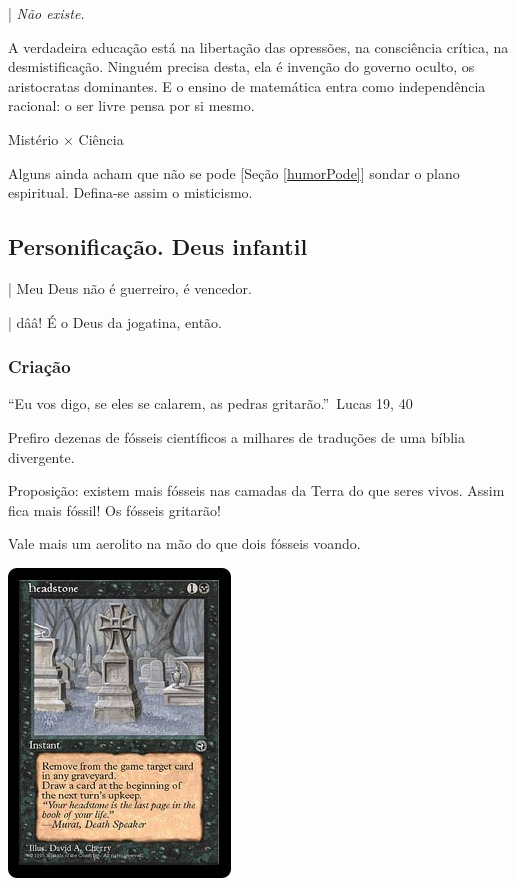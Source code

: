 \documentclass[12pt,a4paper]{article}
\begin{document}
			| \emph{N\~ao existe.}\cite{quevedo}

			A verdadeira educa\c{c}\~ao est\'a na liberta\c{c}\~ao das opressões, na consci\^encia cr\'itica, na desmistifica\c{c}\~ao\cite{freire}. Ningu\'em precisa desta, ela \'e inven\c{c}\~ao do governo oculto, os aristocratas dominantes. E o ensino de matem\'atica entra como independ\^encia racional: o ser livre pensa por si mesmo.

			Mist\'erio $ \times $ Ci\^encia

			Alguns ainda acham que n\~ao se pode [Se\c{c}\~ao \ref{humorPode}] sondar o plano espiritual. Defina-se assim o misticismo.

		\subsection{Personifica\c{c}\~ao. Deus infantil}\label{infantil}
			\begin{flushright}
			\end{flushright}

| Meu Deus n\~ao \'e guerreiro, \'e vencedor.

| d\^a\^a! \'E o Deus da jogatina, ent\~ao.

			\subsubsection{Cria\c{c}\~ao}
				\begin{flushright}
				\end{flushright}

			\textquotedblleft Eu vos digo, se eles se calarem, as pedras gritar\~ao.\textquotedblright\, Lucas 19, 40\cite{x}

Prefiro dezenas de f\'osseis cient\'ificos a milhares de tradu\c{c}\~oes de uma
b\'iblia divergente.

Proposi\c{c}\~ao: existem mais f\'osseis nas camadas da Terra do que seres
vivos. Assim fica mais f\'ossil! Os f\'osseis gritar\~ao!

Vale mais um aerolito na m\~ao do que dois f\'osseis voando.

			\begin{center}
			\includegraphics{lapide}
			\end{center}
\end{document}
